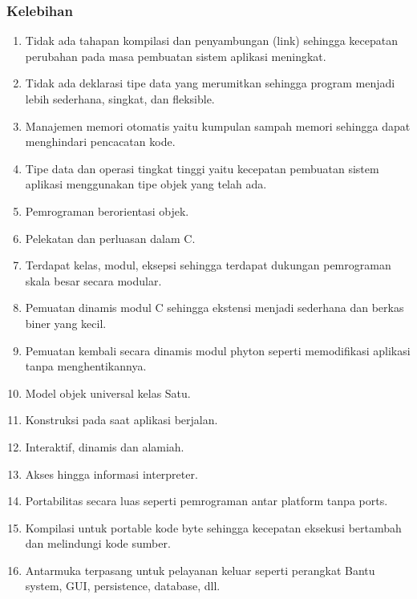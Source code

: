 \subsubsection{Kelebihan}
\begin{enumerate}
\item Tidak ada tahapan kompilasi dan penyambungan (link) sehingga kecepatan perubahan pada masa pembuatan sistem aplikasi meningkat.
\item Tidak ada deklarasi tipe data yang merumitkan sehingga program menjadi lebih sederhana, singkat, dan fleksible.
\item Manajemen memori otomatis yaitu kumpulan sampah memori sehingga dapat menghindari pencacatan kode.
\item Tipe data dan operasi tingkat tinggi yaitu kecepatan pembuatan sistem aplikasi menggunakan tipe objek yang telah ada.
\item Pemrograman berorientasi objek.
\item Pelekatan dan perluasan dalam C.
\item Terdapat kelas, modul, eksepsi sehingga terdapat dukungan pemrograman skala besar secara modular.
\item Pemuatan dinamis modul C sehingga ekstensi menjadi sederhana dan berkas biner yang kecil.
\item Pemuatan kembali secara dinamis modul phyton seperti memodifikasi aplikasi tanpa menghentikannya.
\item Model objek universal kelas Satu.
\item Konstruksi pada saat aplikasi berjalan.
\item Interaktif, dinamis dan alamiah.
\item Akses hingga informasi interpreter.
\item Portabilitas secara luas seperti pemrograman antar platform tanpa ports.
\item Kompilasi untuk portable kode byte sehingga kecepatan eksekusi bertambah dan melindungi kode sumber.
\item Antarmuka terpasang untuk pelayanan keluar seperti perangkat Bantu system, GUI, persistence, database, dll.
\end{enumerate}

